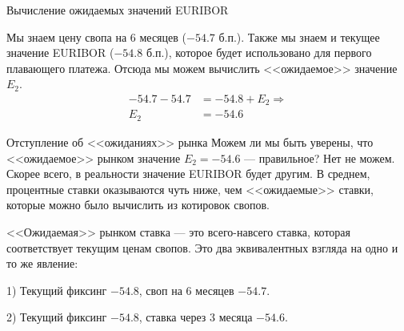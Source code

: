 \documentclass{beamer}
\begin{document}
\begin{frame}{Вычисление ожидаемых значений EURIBOR}
\centering
{}

\justify
Мы знаем цену свопа на 6 месяцев ($-54.7$ б.п.). Также мы знаем и текущее значение EURIBOR ($-54.8$ б.п.), которое будет использовано для первого плавающего платежа. Отсюда мы можем вычислить <<ожидаемое>> значение $E_2$.
\begin{align*}
-54.7 - 54.7 &= -54.8 + E_2 \Rightarrow \\
E_2 &= -54.6
\end{align*}

\end{frame}



\begin{frame}{Отступление об <<ожиданиях>> рынка}
\justify
Можем ли мы быть уверены, что <<ожидаемое>> рынком значение $E_2=-54.6$ --- правильное? Нет не можем. Скорее всего, в реальности значение EURIBOR будет другим. В среднем, процентные ставки оказываются чуть ниже, чем <<ожидаемые>> ставки, которые можно было вычислить из котировок свопов.

\justify
<<Ожидаемая>> рынком ставка --- это всего-навсего ставка, которая соответствует текущим ценам свопов. Это два эквивалентных взгляда на одно и то же явление:

1) Текущий фиксинг $-54.8$, своп на 6 месяцев $-54.7$.

2) Текущий фиксинг $-54.8$, ставка через 3 месяца $-54.6$.
\end{frame}
\end{document}
